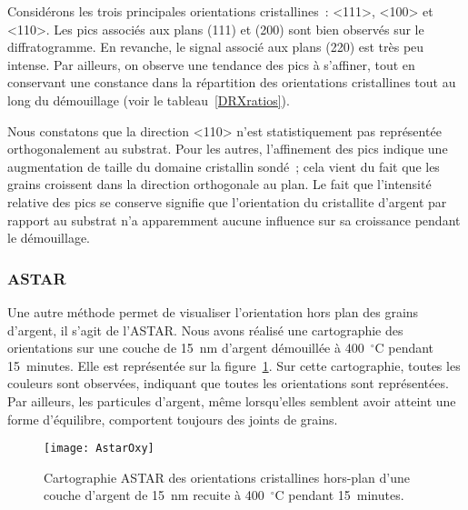 Considérons les trois principales orientations cristallines~: <111>, <100> et <110>. Les pics associés aux plans (111) et (200) sont bien observés sur le diffratogramme. En revanche, le signal associé aux plans (220) est très peu intense. Par ailleurs, on observe une tendance des pics à s'affiner, tout en conservant une constance dans la répartition des orientations cristallines tout au long du démouillage (voir le tableau~\ref{DRXratios}).\par 
Nous constatons que la direction <110> n'est statistiquement pas représentée orthogonalement au substrat. Pour les autres, l'affinement des pics indique une augmentation de taille du domaine cristallin sondé~; cela vient du fait que les grains croissent dans la direction orthogonale au plan. Le fait que l'intensité relative des pics se conserve signifie que l'orientation du cristallite d'argent par rapport au substrat n'a apparemment aucune influence sur sa croissance pendant le démouillage.\par



\subsubsection{ASTAR}
Une autre méthode permet de visualiser l'orientation hors plan des grains d'argent, il s'agit de l'ASTAR. Nous avons réalisé une cartographie des orientations sur une couche de 15~nm d'argent démouillée à 400~$^\circ$C pendant 15~minutes. Elle est représentée sur la figure~\ref{AstarOxy}. Sur cette cartographie, toutes les couleurs sont observées, indiquant que toutes les orientations sont représentées. Par ailleurs, les particules d'argent, même lorsqu'elles semblent avoir atteint une forme d'équilibre, comportent toujours des joints de grains.\par 
{}

\begin{figure}[h]
	\centering
	\texttt{[image: AstarOxy]}
	\caption{Cartographie ASTAR des orientations cristallines hors-plan d'une couche d'argent de 15~nm recuite à 400~$^\circ$C pendant 15~minutes. }
	\label{AstarOxy}
\end{figure}

